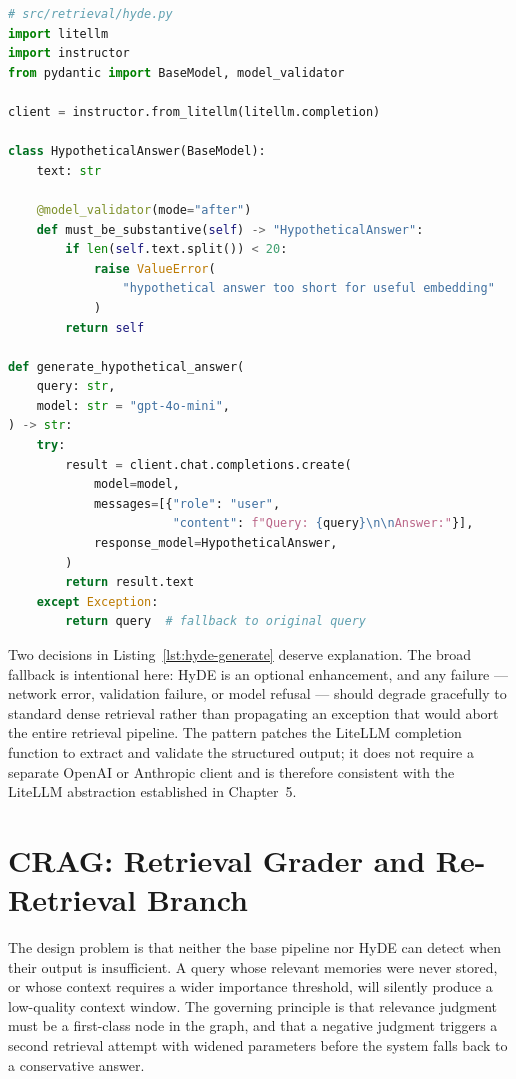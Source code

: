 \begin{lstlisting}[language=Python,
  caption={HypotheticalAnswer model and generation function},
  label={lst:hyde-generate}]
# src/retrieval/hyde.py
import litellm
import instructor
from pydantic import BaseModel, model_validator

client = instructor.from_litellm(litellm.completion)

class HypotheticalAnswer(BaseModel):
    text: str

    @model_validator(mode="after")
    def must_be_substantive(self) -> "HypotheticalAnswer":
        if len(self.text.split()) < 20:
            raise ValueError(
                "hypothetical answer too short for useful embedding"
            )
        return self

def generate_hypothetical_answer(
    query: str,
    model: str = "gpt-4o-mini",
) -> str:
    try:
        result = client.chat.completions.create(
            model=model,
            messages=[{"role": "user",
                       "content": f"Query: {query}\n\nAnswer:"}],
            response_model=HypotheticalAnswer,
        )
        return result.text
    except Exception:
        return query  # fallback to original query
\end{lstlisting}

Two decisions in Listing~\ref{lst:hyde-generate} deserve explanation.
The broad  fallback is intentional here: HyDE is an
optional enhancement, and any failure --- network error, validation failure,
or model refusal --- should degrade gracefully to standard dense retrieval
rather than propagating an exception that would abort the entire retrieval
pipeline. The  pattern
patches the LiteLLM completion function to extract and validate the
 structured output; it does not require a separate
OpenAI or Anthropic client and is therefore consistent with the LiteLLM
abstraction established in Chapter~5.


\section{CRAG: Retrieval Grader and Re-Retrieval Branch}
\label{sec:crag}

The design problem is that neither the base pipeline nor HyDE can detect
when their output is insufficient. A query whose relevant memories were
never stored, or whose context requires a wider importance threshold, will
silently produce a low-quality context window. The governing principle is
that relevance judgment must be a first-class node in the graph, and that
a negative judgment triggers a second retrieval attempt with widened
parameters before the system falls back to a conservative answer.

